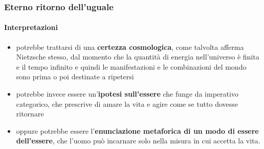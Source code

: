 \documentclass{beamer}
\begin{document}
		\begin{frame}
			\frametitle{Eterno ritorno dell'uguale}
			\framesubtitle{Interpretazioni}
			\begin{itemize}
				\item potrebbe trattarsi di una \textbf{certezza cosmologica}, come talvolta afferma Nietzsche stesso, dal momento che la quantità di energia nell'universo è finita e il tempo infinito e quindi le manifestazioni e le combinazioni del mondo sono prima o poi destinate a ripetersi
				\item potrebbe invece essere un'\textbf{ipotesi sull'essere} che funge da imperativo categorico, che prescrive di amare la vita e agire come se tutto dovesse ritornare
				\item oppure potrebbe essere l'\textbf{enunciazione metaforica di un modo di essere dell'essere}, che l'uomo può incarnare solo nella misura in cui accetta la vita.
			\end{itemize}
		\end{frame}
		
\end{document}
